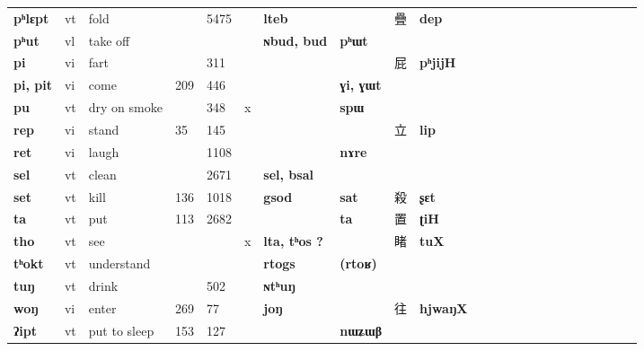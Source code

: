 \documentclass[oldfontcommands,oneside,a4paper,11pt]{article}
\newcommand{\ipa}[1]{{\phon\textbf{#1}}}
\newcommand{\zh}[1]{{\cn #1}}
\begin{document}
\begin{table}[h]
{\begin{tabular}{lllllllllllllllllllllll}
\ipa{pʰlɛpt}   &  	vt   &  	fold   &  	\tiny    &  	\tiny 5475   &  	   &  	\ipa{lteb}   &  	\ipa{}   &  	\zh{疊}   &  	\ipa{dep}   \\  		
\ipa{pʰut}   &  	vl   &  	take off   &  	\tiny    &  	\tiny    &  	   &  	\ipa{ɴbud, bud}   &  	\ipa{pʰɯt}   &  	\zh{}   &  	\ipa{}   \\  		
\ipa{pi}   &  	vi   &  	fart   &  	\tiny    &  	\tiny 311   &  	   &  	\ipa{}   &  	\ipa{}   &  	\zh{屁}   &  	\ipa{pʰjijH}   \\  		
\ipa{pi, pit}   &  	vi   &  	come   &  	\tiny 209   &  	\tiny 446   &  	   &  	\ipa{}   &  	\ipa{ɣi, ɣɯt}   &  	\zh{}   &  	\ipa{}   \\  		
\ipa{pu}   &  	vt   &  	dry on smoke   &  	\tiny    &  	\tiny 348   &  	x   &  	\ipa{}   &  	\ipa{spɯ}   &  	\zh{}   &  	\ipa{}   \\  		
\ipa{rep}   &  	vi   &  	stand   &  	\tiny 35   &  	\tiny 145   &  	   &  	\ipa{}   &  	\ipa{}   &  	\zh{立}   &  	\ipa{lip}   \\  		
\ipa{ret}   &  	vi   &  	laugh   &  	\tiny    &  	\tiny 1108   &  	   &  	\ipa{}   &  	\ipa{nɤre}   &  	\zh{}   &  	\ipa{}   \\  		
\ipa{sel}   &  	vt   &  	clean   &  	\tiny    &  	\tiny 2671   &  	   &  	\ipa{sel, bsal}   &  	\ipa{}   &  	\zh{}   &  	\ipa{}   \\  		
\ipa{set}   &  	vt   &  	kill   &  	\tiny 136   &  	\tiny 1018   &  	   &  	\ipa{gsod}   &  	\ipa{sat}   &  	\zh{殺}   &  	\ipa{ʂɛt}   \\  		
\ipa{ta}   &  	vt   &  	put   &  	\tiny 113   &  	\tiny 2682   &  	   &  	\ipa{}   &  	\ipa{ta}   &  	\zh{置}   &  	\ipa{ʈiH}   \\  		
\ipa{tho}   &  	vt   &  	see   &  	\tiny     &  	\tiny    &  	x   &  	\ipa{lta,  tʰos ?}   &  	\ipa{}   &  	\zh{睹}   &  	\ipa{tuX}   \\  		
\ipa{tʰokt}   &  	vt   &  	understand   &  	\tiny    &  	\tiny    &  	   &  	\ipa{rtogs}   &  	\ipa{(rtoʁ)}   &  	\zh{}   &  	\ipa{}   \\  		
\ipa{tuŋ}   &  	vt   &  	drink   &  	\tiny    &  	\tiny 502   &  	   &  	\ipa{ɴtʰuŋ}   &  	\ipa{}   &  	\zh{}   &  	\ipa{}   \\  		
\ipa{woŋ}   &  	vi   &  	enter   &  	\tiny 269   &  	\tiny 77   &  	   &  	\ipa{joŋ}   &  	\ipa{}   &  	\zh{往}   &  	\ipa{hjwaŋX}   \\  		
\ipa{ʔipt}   &  	vt   &  	put to sleep   &  	\tiny 153   &  	\tiny 127   &  	   &  	\ipa{}   &  	\ipa{nɯʑɯβ}   &  	\zh{}   &  	\ipa{}   \\  		
\bottomrule
\end{tabular}}
\end{table}
\end{document}
